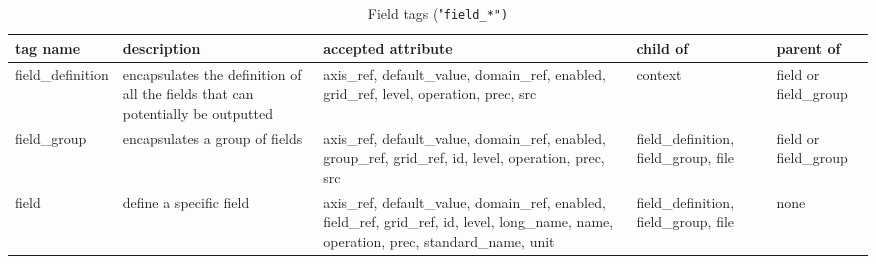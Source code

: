 \documentclass[../main/NEMO_manual]{subfiles}
\begin{document}
\begin{table}
  \scriptsize
  \begin{tabularx}{\textwidth}{|l|X|X|X|l|}
    \hline
    tag name                                                                                &
    description                                                                             &
    accepted attribute                                                                      &
    child of                                                                                &
    parent of             \\
    \hline
    \hline
    field\_definition                                                                       &
    encapsulates the definition of all the fields that can potentially be outputted         &
    axis\_ref, default\_value, domain\_ref, enabled, grid\_ref, level, operation, prec, src &
    context                                                                                 &
    field or field\_group \\
    \hline
    field\_group                                                                            &
    encapsulates a group of fields                                                          &
    axis\_ref, default\_value, domain\_ref, enabled, group\_ref, grid\_ref,
    id, level, operation, prec, src                                                         &
    field\_definition, field\_group, file                                                   &
    field or field\_group \\
    \hline
    field                                                                                   &
    define a specific field                                                                 &
    axis\_ref, default\_value, domain\_ref, enabled, field\_ref, grid\_ref,
    id, level, long\_name, name, operation, prec, standard\_name, unit                      &
    field\_definition, field\_group, file                                                   &
    none                  \\
    \hline
  \end{tabularx}
  \caption{Field tags ("\tt{field\_*}")}
\end{table}
\end{document}
